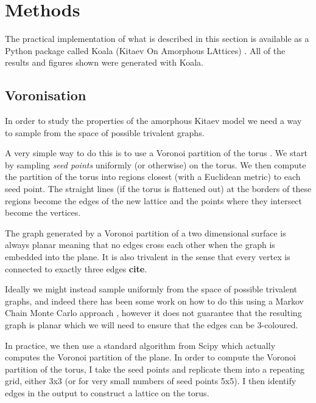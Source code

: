 \hypertarget{methods}{%
\section{Methods}\label{methods}}

The practical implementation of what is described in this section is available as a Python package called Koala (Kitaev On Amorphous LAttices) \textcite{tomImperialCMTHKoalaFirst2022}. All of the results and figures shown were generated with Koala.

\hypertarget{voronisation}{%
\subsection{Voronisation}\label{voronisation}}

In order to study the properties of the amorphous Kitaev model we need a way to sample from the space of possible trivalent graphs.

A very simple way to do this is to use a Voronoi partition of the torus \autocite{mitchellAmorphousTopologicalInsulators2018,marsalTopologicalWeaireThorpeModels2020,florescu_designer_2009}. We start by sampling \emph{seed points} uniformly (or otherwise) on the torus. We then compute the partition of the torus into regions closest (with a Euclidean metric) to each seed point. The straight lines (if the torus is flattened out) at the borders of these regions become the edges of the new lattice and the points where they intersect become the vertices.

The graph generated by a Voronoi partition of a two dimensional surface is always planar meaning that no edges cross each other when the graph is embedded into the plane. It is also trivalent in the sense that every vertex is connected to exactly three edges \textbf{cite}.

Ideally we might instead sample uniformly from the space of possible trivalent graphs, and indeed there has been some work on how to do this using a Markov Chain Monte Carlo approach \textcite{alyamiUniformSamplingDirected2016}, however it does not guarantee that the resulting graph is planar which we will need to ensure that the edges can be 3-coloured.

In practice, we then use a standard algorithm \textcite{barberQuickhullAlgorithmConvex1996} from Scipy \textcite{virtanenSciPyFundamentalAlgorithms2020a} which actually computes the Voronoi partition of the plane. In order to compute the Voronoi partition of the torus, I take the seed points and replicate them into a repeating grid, either 3x3 (or for very small numbers of seed points 5x5). I then identify edges in the output to construct a lattice on the torus.

